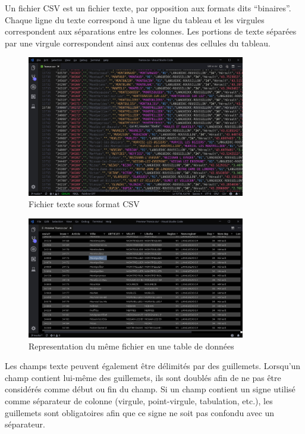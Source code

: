 \documentclass[oneside,13pt,a4paper]{report}
\begin{document}
Un fichier CSV est un fichier texte, par opposition aux formats dits \enquote{binaires}.
Chaque ligne du texte correspond à une ligne du tableau et les virgules correspondent aux séparations entre les colonnes.
Les portions de texte séparées par une virgule correspondent ainsi aux contenus des cellules du tableau.

\begin{figure}[!h]
	\centering
	\includegraphics[width=0.85\textwidth]{img/csv.png}
	\caption{Fichier texte sous format CSV}
\end{figure}

\begin{figure}[!h]
	\centering
	\includegraphics[width=0.85\textwidth]{img/csv_tables.png}
	\caption{Representation du même fichier en une table de données}
\end{figure}

Les champs texte peuvent également être délimités par des guillemets. Lorsqu'un champ contient lui-même des guillemets, ils sont doublés afin de ne pas être considérés comme début ou fin du champ.
Si un champ contient un signe utilisé comme séparateur de colonne (virgule, point-virgule, tabulation, etc.), les guillemets sont obligatoires afin que ce signe ne soit pas confondu avec un séparateur.
\end{document}
